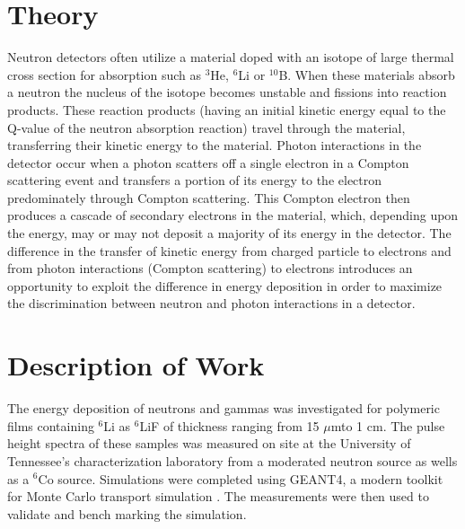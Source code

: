 \documentclass{anstrans}
\newcommand{\iso}[2]{${}^{#2}${#1}}
\newcommand{\micron}{$\mu$m}
\begin{document}
\section{Theory}
Neutron detectors often utilize a material doped with an isotope of large thermal cross section for absorption such as \iso{He}{3}, \iso{Li}{6} or \iso{B}{10}. 
When these materials absorb a neutron the nucleus of the isotope becomes unstable and fissions into reaction products.
These reaction products (having an initial kinetic energy equal to the Q-value of the neutron absorption reaction) travel through the material, transferring their kinetic energy to the material.
Photon interactions in the detector occur when a photon scatters off a single electron in a Compton scattering event and transfers a portion of its energy to the electron predominately through Compton scattering.
This Compton electron then produces a cascade of secondary electrons in the material, which, depending upon the energy, may or may not deposit a majority of its energy in the detector.
The difference in the transfer of kinetic energy from charged particle to electrons and from photon interactions (Compton scattering) to electrons introduces an opportunity to exploit the difference in energy deposition in order to maximize the discrimination between neutron and photon interactions in a detector.

\section{Description of Work}
The energy deposition of neutrons and gammas was investigated for polymeric films containing \iso{Li}{6} as \iso{LiF}{6} of thickness ranging from 15 \micron to 1 cm.
The pulse height spectra of these samples was measured on site at the University of Tennessee's characterization laboratory from a moderated neutron source as wells as a \iso{Co}{6} source.
Simulations were completed using GEANT4, a modern toolkit for Monte Carlo transport simulation \cite{agostinelli_geant4simulation_2003,allison_geant4_2006}.
The measurements were then used to validate and bench marking the simulation.
\end{document}
